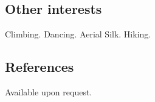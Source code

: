 \documentclass[letterpaper]{twentysecondcv} %
\begin{document}


\subsection{Other interests} Climbing. Dancing. Aerial Silk. Hiking.
\subsection{References}
Available upon request.






\end{document}
